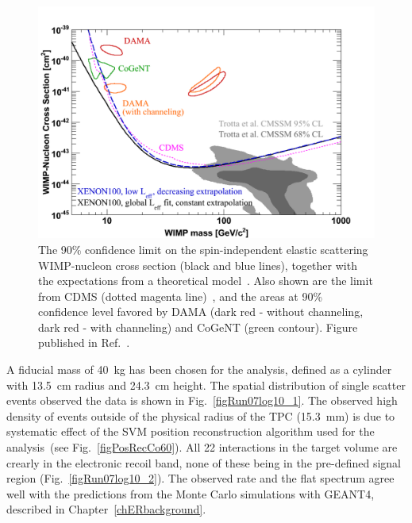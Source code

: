 \begin{figure}[!b]
\centering
\includegraphics[width=0.6\linewidth]{plots/run07/run07_limit_mod.png}
\caption[The first XENON100 exclusion limit on the spin-independent elastic scattering WIMP-nucleon cross section]{The 90\% confidence limit on the spin-independent elastic scattering WIMP-nucleon cross section (black and blue lines), together with the expectations from a theoretical model~\cite{Yellin}. Also shown are the limit from CDMS (dotted magenta line)~\cite{CDMS_limit}, and the areas at 90\% confidence level favored by DAMA (dark red - without channeling, dark red - with channeling) and CoGeNT (green contour). Figure published in Ref.~\cite{xe100-run07}.}
\label{figRun07limit}
\end{figure}

A fiducial mass of 40~kg has been chosen for the analysis, defined as a cylinder with 13.5~cm radius  and 24.3~cm height. The spatial distribution of single scatter events observed the data is shown in Fig.~\ref{figRun07log10_1}. The observed high density of events outside of the physical radius of the TPC (15.3~mm) is due to systematic effect of the SVM position reconstruction algorithm used for the analysis~(see Fig.~\ref{figPosRecCo60}). All 22 interactions in the target volume are crearly in the electronic recoil band, none of these being in the pre-defined signal region (Fig.~\ref{figRun07log10_2}). The observed rate and the flat spectrum agree well with the predictions from the Monte Carlo simulations with GEANT4, described in Chapter~\ref{chERbackground}. 

